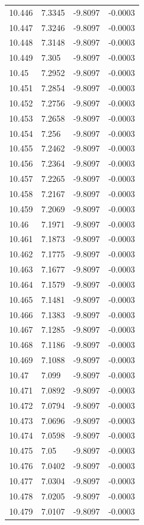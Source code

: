 \begin{tabular}{llll}
10.446 & 7.3345 & -9.8097 & -0.0003 \\
10.447 & 7.3246 & -9.8097 & -0.0003 \\
10.448 & 7.3148 & -9.8097 & -0.0003 \\
10.449 & 7.305 & -9.8097 & -0.0003 \\
10.45 & 7.2952 & -9.8097 & -0.0003 \\
10.451 & 7.2854 & -9.8097 & -0.0003 \\
10.452 & 7.2756 & -9.8097 & -0.0003 \\
10.453 & 7.2658 & -9.8097 & -0.0003 \\
10.454 & 7.256 & -9.8097 & -0.0003 \\
10.455 & 7.2462 & -9.8097 & -0.0003 \\
10.456 & 7.2364 & -9.8097 & -0.0003 \\
10.457 & 7.2265 & -9.8097 & -0.0003 \\
10.458 & 7.2167 & -9.8097 & -0.0003 \\
10.459 & 7.2069 & -9.8097 & -0.0003 \\
10.46 & 7.1971 & -9.8097 & -0.0003 \\
10.461 & 7.1873 & -9.8097 & -0.0003 \\
10.462 & 7.1775 & -9.8097 & -0.0003 \\
10.463 & 7.1677 & -9.8097 & -0.0003 \\
10.464 & 7.1579 & -9.8097 & -0.0003 \\
10.465 & 7.1481 & -9.8097 & -0.0003 \\
10.466 & 7.1383 & -9.8097 & -0.0003 \\
10.467 & 7.1285 & -9.8097 & -0.0003 \\
10.468 & 7.1186 & -9.8097 & -0.0003 \\
10.469 & 7.1088 & -9.8097 & -0.0003 \\
10.47 & 7.099 & -9.8097 & -0.0003 \\
10.471 & 7.0892 & -9.8097 & -0.0003 \\
10.472 & 7.0794 & -9.8097 & -0.0003 \\
10.473 & 7.0696 & -9.8097 & -0.0003 \\
10.474 & 7.0598 & -9.8097 & -0.0003 \\
10.475 & 7.05 & -9.8097 & -0.0003 \\
10.476 & 7.0402 & -9.8097 & -0.0003 \\
10.477 & 7.0304 & -9.8097 & -0.0003 \\
10.478 & 7.0205 & -9.8097 & -0.0003 \\
10.479 & 7.0107 & -9.8097 & -0.0003 \\

\end{tabular}
